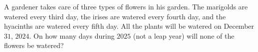 A gardener takes care of three types of flowers in his garden. The marigolds are watered every third day, the irises are watered every fourth day, and the hyacinths are watered every fifth day. All the plants will be watered on December $31$, $2024$. On how many days during $2025$ (not a leap year) will none of the flowers be watered?
